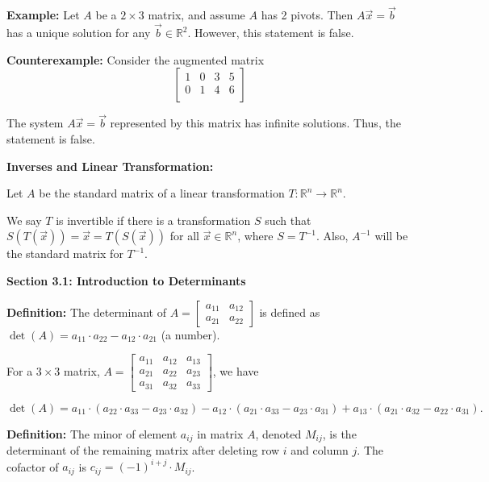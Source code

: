 \documentclass{article}
\begin{document}
\textbf{Example:} Let \( A \) be a \( 2 \times 3 \) matrix, and assume \( A \) has 2 pivots. Then \( A\vec{x}=\vec{b} \) has a unique solution for any \( \vec{b} \in \mathbb{R}^2 \). However, this statement is false. 

\textbf{Counterexample:} Consider the augmented matrix
\[ \left[ \begin{array}{ccc|c}
1 & 0 & 3 & 5 \\
0 & 1 & 4 & 6 \\
\end{array} \right] \]

The system \( A\vec{x}=\vec{b} \) represented by this matrix has infinite solutions. Thus, the statement is false.

\textbf{Inverses and Linear Transformation:}

Let \( A \) be the standard matrix of a linear transformation \( T: \mathbb{R}^n \rightarrow \mathbb{R}^n \).

We say \( T \) is invertible if there is a transformation \( S \) such that \( S(T(\vec{x})) = \vec{x} = T(S(\vec{x})) \) for all \( \vec{x} \in \mathbb{R}^n \), where \( S = T^{-1} \). Also, \( A^{-1} \) will be the standard matrix for \( T^{-1} \).

\textbf{Section 3.1: Introduction to Determinants}

\textbf{Definition:} The determinant of \( A = \begin{bmatrix} a_{11} & a_{12} \\ a_{21} & a_{22} \end{bmatrix} \) is defined as \( \det(A) = a_{11} \cdot a_{22} - a_{12} \cdot a_{21} \) (a number). 

For a \( 3 \times 3 \) matrix, \( A = \begin{bmatrix} a_{11} & a_{12} & a_{13} \\ a_{21} & a_{22} & a_{23} \\ a_{31} & a_{32} & a_{33} \end{bmatrix} \), we have 

\[ \det(A) = a_{11} \cdot (a_{22} \cdot a_{33} - a_{23} \cdot a_{32}) - a_{12} \cdot (a_{21} \cdot a_{33} - a_{23} \cdot a_{31}) + a_{13} \cdot (a_{21} \cdot a_{32} - a_{22} \cdot a_{31}). \]

\textbf{Definition:} The minor of element \( a_{ij} \) in matrix \( A \), denoted \( M_{ij} \), is the determinant of the remaining matrix after deleting row \( i \) and column \( j \). The cofactor of \( a_{ij} \) is \( c_{ij} = (-1)^{i+j} \cdot M_{ij} \). 
\end{document}

